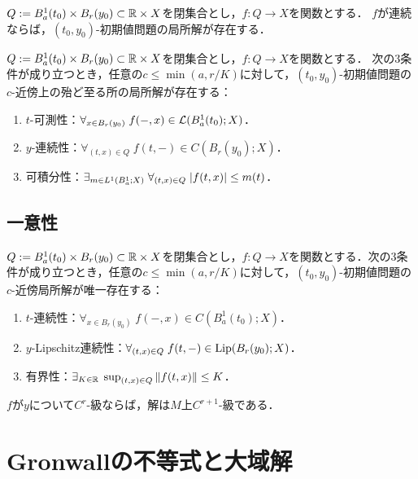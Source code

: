 \documentclass[uplatex, dvipdfmx]{jsreport}
\begin{document}
\begin{theorem}
    $Q:=B^1_a(t_0)\times B_r(y_0)\subset\mathbb{R}\times X$を閉集合とし，$f:Q\to X$を関数とする．
    $f$が連続ならば，$(t_0,y_0)$-初期値問題の局所解が存在する．
\end{theorem}

\begin{theorem}[Caratheodory]
    $Q:=B^1_a(t_0)\times B_r(y_0)\subset\mathbb{R}\times X$を閉集合とし，$f:Q\to X$を関数とする．
    次の3条件が成り立つとき，任意の$c\le\min(a,r/K)$に対して，$(t_0,y_0)$-初期値問題の$c$-近傍上の殆ど至る所の局所解が存在する：
    \begin{enumerate}
        \item $t$-可測性：$\forall_{x\in B_r(y_0)}\;f(-,x)\in \mathcal{L}(B_a^1(t_0);X)$．
        \item $y$-連続性：$\forall_{(t,x)\in Q}\;f(t,-)\in C(B_r(y_0);X)$．
        \item 可積分性：$\exists_{m\in L^1(B_a^1;X)}\;\forall_{(t,x)\in Q}\;\lvert f(t,x)\rvert\le m(t)$．
    \end{enumerate}
\end{theorem}

\subsection{一意性}

\begin{theorem}
    $Q:=B^1_a(t_0)\times B_r(y_0)\subset\mathbb{R}\times X$を閉集合とし，$f:Q\to X$を関数とする．次の3条件が成り立つとき，任意の$c\le\min(a,r/K)$に対して，$(t_0,y_0)$-初期値問題の$c$-近傍局所解が唯一存在する：
    \begin{enumerate}
        \item $t$-連続性：$\forall_{x\in B_r(y_0)}\;f(-,x)\in C(B_a^1(t_0);X)$．
        \item $y$-Lipschitz連続性：$\forall_{(t,x)\in Q}\;f(t,-)\in\mathrm{Lip}(B_r(y_0);X)$．
        \item 有界性：$\exists_{K\in\mathbb{R}}\;\sup_{(t,x)\in Q}\|f(t,x)\|\le K$．
    \end{enumerate}
\end{theorem}

\begin{corollary}
    $f$が$y$について$C^r$-級ならば，解は$M$上$C^{r+1}$-級である．
\end{corollary}

\section{Gronwallの不等式と大域解}
\end{document}
